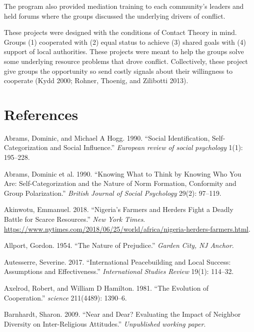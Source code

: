 \documentclass[11pt]{article}
\begin{document}
The program also provided mediation training to each community's leaders
and held forums where the groups discussed the underlying drivers of
conflict.

These projects were designed with the conditions of Contact Theory in
mind. Groups (1) cooperated with (2) equal status to achieve (3) shared
goals with (4) support of local authorities. These projects were meant
to help the groups solve some underlying resource problems that drove
conflict. Collectively, these project give groups the opportunity so
send costly signals about their willingness to cooperate (Kydd 2000;
Rohner, Thoenig, and Zilibotti 2013).

\hypertarget{references}{%
\section*{References}\label{references}}

\hypertarget{refs}{}
\leavevmode\hypertarget{ref-abrams1990social}{}%
Abrams, Dominic, and Michael A Hogg. 1990. ``Social Identification,
Self-Categorization and Social Influence.'' \emph{European review of
social psychology} 1(1): 195--228.

\leavevmode\hypertarget{ref-abrams1990knowing}{}%
Abrams, Dominic et al. 1990. ``Knowing What to Think by Knowing Who You
Are: Self-Categorization and the Nature of Norm Formation, Conformity
and Group Polarization.'' \emph{British Journal of Social Psychology}
29(2): 97--119.

\leavevmode\hypertarget{ref-nyt2018nigeria}{}%
Akinwotu, Emmanuel. 2018. ``Nigeria's Farmers and Herders Fight a Deadly
Battle for Scarce Resources.'' \emph{New York Times}.
\url{https://www.nytimes.com/2018/06/25/world/africa/nigeria-herders-farmers.html}.

\leavevmode\hypertarget{ref-allport1954prejudice}{}%
Allport, Gordon. 1954. ``The Nature of Prejudice.'' \emph{Garden City,
NJ Anchor}.

\leavevmode\hypertarget{ref-autesserre2017international}{}%
Autesserre, Severine. 2017. ``International Peacebuilding and Local
Success: Assumptions and Effectiveness.'' \emph{International Studies
Review} 19(1): 114--32.

\leavevmode\hypertarget{ref-axelrod1981evolution}{}%
Axelrod, Robert, and William D Hamilton. 1981. ``The Evolution of
Cooperation.'' \emph{science} 211(4489): 1390--6.

\leavevmode\hypertarget{ref-barnhardt2009near}{}%
Barnhardt, Sharon. 2009. ``Near and Dear? Evaluating the Impact of
Neighbor Diversity on Inter-Religious Attitudes.'' \emph{Unpublished
working paper}.
\end{document}
